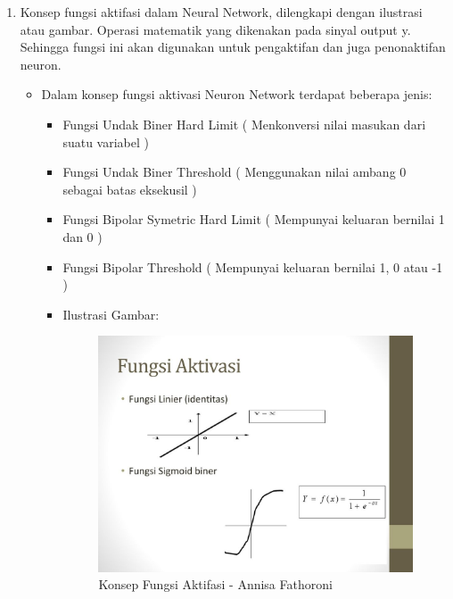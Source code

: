 \begin{enumerate}
\begin{itemize}
\end{itemize}

\item Konsep fungsi aktifasi dalam Neural Network, dilengkapi dengan ilustrasi atau gambar.
Operasi matematik yang dikenakan pada sinyal output y. Sehingga fungsi ini akan digunakan untuk pengaktifan dan juga penonaktifan neuron.
\begin{itemize}
\item Dalam konsep fungsi aktivasi Neuron Network terdapat beberapa jenis:
\begin{itemize}
\item Fungsi Undak Biner Hard Limit ( Menkonversi nilai masukan dari suatu variabel )
\item Fungsi Undak Biner Threshold ( Menggunakan nilai ambang 0 sebagai batas eksekusil )
\item Fungsi Bipolar Symetric Hard Limit ( Mempunyai keluaran bernilai 1 dan 0 )
\item Fungsi Bipolar Threshold ( Mempunyai keluaran bernilai 1, 0 atau -1 )

\item Ilustrasi Gambar:

\begin{figure}[!hbtp]
\centering
\includegraphics[scale=0.7]{figures/Chapter6AnnisaFathoroni4.jpg}
\caption{Konsep Fungsi Aktifasi - Annisa Fathoroni}
\label{Konsep Fungsi Aktivasi - Annisa Fathoroni}
\end{figure}

\end{itemize}
\end{itemize}


\end{enumerate}
